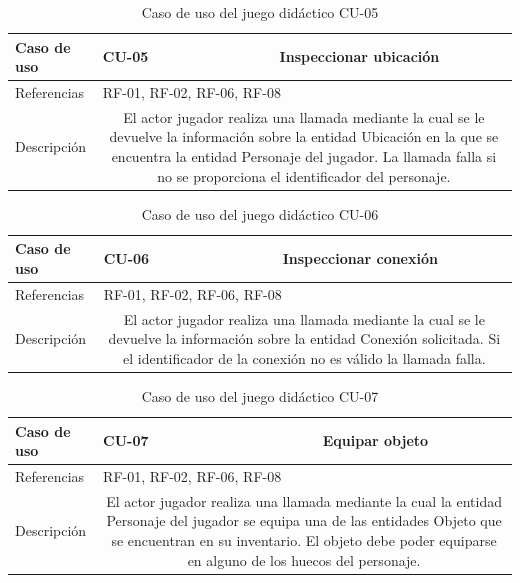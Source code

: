 \begin{table}[H]
	\centering
	\small
	\begin{tabularx}{\linewidth}{|l|cc|}
		\hline
		{\cellcolor[HTML]{C0C0C0} Caso de uso} & \multicolumn{1}{l|}{CU-05} & Inspeccionar ubicación \\ \hline
		{\cellcolor[HTML]{C0C0C0} Referencias} & \multicolumn{2}{l|}{RF-01, RF-02, RF-06, RF-08} \\ \hline
		{\cellcolor[HTML]{C0C0C0} Descripción} & \multicolumn{2}{X|}{El actor jugador realiza una llamada mediante la cual se le devuelve la información sobre la entidad Ubicación en la que se encuentra la entidad Personaje del jugador. La llamada falla si no se proporciona el identificador del personaje.} \\ \hline
	\end{tabularx}
	
	\vspace{0.5cm}
	\caption{Caso de uso del juego didáctico CU-05}
	\label{tab:juego-cu-05}
\end{table}

\begin{table}[H]
	\centering
	\small
	\begin{tabularx}{\linewidth}{|l|cc|}
		\hline
		{\cellcolor[HTML]{C0C0C0} Caso de uso} & \multicolumn{1}{l|}{CU-06} & Inspeccionar conexión \\ \hline
		{\cellcolor[HTML]{C0C0C0} Referencias} & \multicolumn{2}{l|}{RF-01, RF-02, RF-06, RF-08} \\ \hline
		{\cellcolor[HTML]{C0C0C0} Descripción} & \multicolumn{2}{X|}{El actor jugador realiza una llamada mediante la cual se le devuelve la información sobre la entidad Conexión solicitada. Si el identificador de la conexión no es válido la llamada falla.} \\ \hline
	\end{tabularx}
	
	\vspace{0.5cm}
	\caption{Caso de uso del juego didáctico CU-06}
	\label{tab:juego-cu-06}
\end{table}

\begin{table}[H]
	\centering
	\small
	\begin{tabularx}{\linewidth}{|l|cc|}
		\hline
		{\cellcolor[HTML]{C0C0C0} Caso de uso} & \multicolumn{1}{l|}{CU-07} & Equipar objeto \\ \hline
		{\cellcolor[HTML]{C0C0C0} Referencias} & \multicolumn{2}{l|}{RF-01, RF-02, RF-06, RF-08} \\ \hline
		{\cellcolor[HTML]{C0C0C0} Descripción} & \multicolumn{2}{X|}{El actor jugador realiza una llamada mediante la cual la entidad Personaje del jugador se equipa una de las entidades Objeto que se encuentran en su inventario. El objeto debe poder equiparse en alguno de los huecos del personaje.} \\ \hline
	\end{tabularx}
	
	\vspace{0.5cm}
	\caption{Caso de uso del juego didáctico CU-07}
	\label{tab:juego-cu-07}
\end{table}

